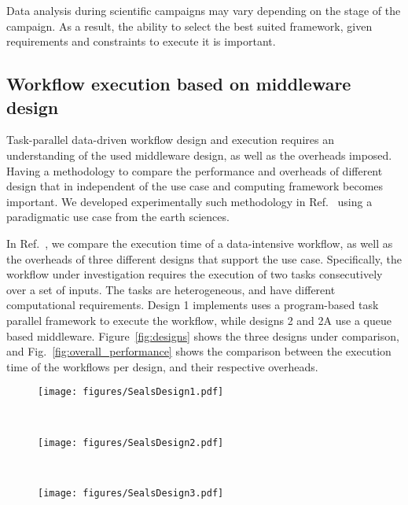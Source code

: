 Data analysis during scientific campaigns may vary depending on the stage of the campaign. 
As a result, the ability to select the best suited framework, given requirements and constraints to execute it is important. 

\subsection{Workflow execution based on middleware design}
\label{design_comp}
Task-parallel data-driven workflow design and execution requires an understanding of the used middleware design, as well as the overheads imposed.
Having a methodology to compare the performance and overheads of different design that in independent of the use case and computing framework becomes important.
We developed experimentally such methodology in Ref.~\cite{paraskevakos2019workflow} using a paradigmatic use case from the earth sciences.

In Ref.~\cite{paraskevakos2019workflow}, we compare the execution time of a data-intensive workflow, as well as the overheads of three different designs that support the use case.
Specifically, the workflow under investigation requires the execution of two tasks consecutively over a set of inputs. 
The tasks are heterogeneous, and have different computational requirements. 
Design 1 implements uses a program-based task parallel framework to execute the workflow, while designs 2 and 2A use a queue based middleware.
Figure~\ref{fig:designs} shows the three designs under comparison, and Fig.~\ref{fig:overall_performance} shows the comparison between the execution time of the workflows per design, and their respective overheads.

\begin{figure*}[ht!]
    \centering
    \begin{subfigure}[b]{0.32\textwidth}
        \texttt{[image: figures/SealsDesign1.pdf]}
        \caption{}
		\label{fig:seals_design1}
    \end{subfigure}%
    ~ 
    \begin{subfigure}[b]{0.32\textwidth}
        \texttt{[image: figures/SealsDesign2.pdf]}
        \caption{}\label{fig:seals_design2}
    \end{subfigure}%
    ~ 
    \begin{subfigure}[b]{0.32\textwidth}
        \texttt{[image: figures/SealsDesign3.pdf]}
		\caption{}\label{fig:seals_design3}
    \end{subfigure}
    \caption{Design approaches to implement the workflow required for the
    Seals use case.~\ref{fig:seals_design1}--\textbf{Design 1}: Pipeline,
    stage and task based design.~\ref{fig:seals_design2}--\textbf{Design 2}:
    Queue based design with a single queue for all the tiling
    tasks.~\ref{fig:seals_design3}--\textbf{Design 2.A}: Queue based design
    with multiple queues for the tiling tasks.}\label{fig:designs}
\end{figure*}

